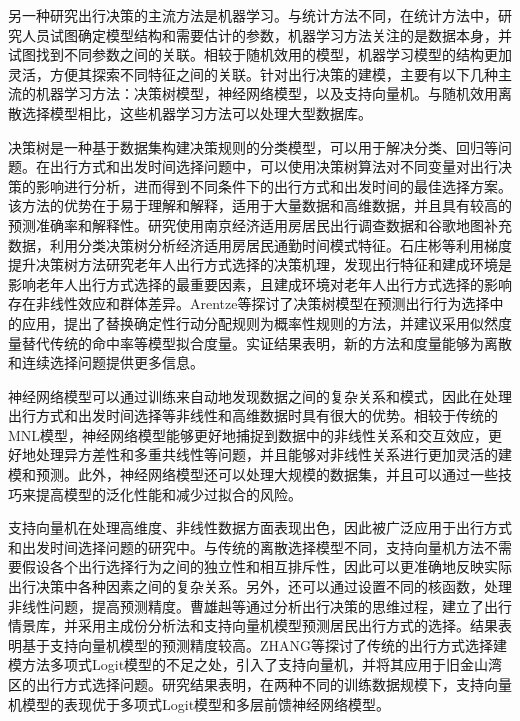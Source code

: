另一种研究出行决策的主流方法是机器学习。与统计方法不同，在统计方法中，研究人员试图确定模型结构和需要估计的参数，机器学习方法关注的是数据本身，并试图找到不同参数之间的关联\cite{mahesh2020machine}。相较于随机效用的模型，机器学习模型的结构更加灵活，方便其探索不同特征之间的关联。针对出行决策的建模，主要有以下几种主流的机器学习方法：决策树模型，神经网络模型，以及支持向量机\cite{pineda2019review}。与随机效用离散选择模型相比，这些机器学习方法可以处理大型数据库。

决策树是一种基于数据集构建决策规则的分类模型，可以用于解决分类、回归等问题。在出行方式和出发时间选择问题中，可以使用决策树算法对不同变量对出行决策的影响进行分析，进而得到不同条件下的出行方式和出发时间的最佳选择方案。该方法的优势在于易于理解和解释，适用于大量数据和高维数据，并且具有较高的预测准确率和解释性。研究\cite{以中国南京为例}使用南京经济适用房居民出行调查数据和谷歌地图补充数据，利用分类决策树分析经济适用房居民通勤时间模式特征。石庄彬\cite{石庄彬}等利用梯度提升决策树方法研究老年人出行方式选择的决策机理，发现出行特征和建成环境是影响老年人出行方式选择的最重要因素，且建成环境对老年人出行方式选择的影响存在非线性效应和群体差异。Arentze等\cite{arentze2003measuring}探讨了决策树模型在预测出行行为选择中的应用，提出了替换确定性行动分配规则为概率性规则的方法，并建议采用似然度量替代传统的命中率等模型拟合度量。实证结果表明，新的方法和度量能够为离散和连续选择问题提供更多信息。

神经网络模型可以通过训练来自动地发现数据之间的复杂关系和模式，因此在处理出行方式和出发时间选择等非线性和高维数据时具有很大的优势。相较于传统的MNL模型，神经网络模型能够更好地捕捉到数据中的非线性关系和交互效应，更好地处理异方差性和多重共线性等问题，并且能够对非线性关系进行更加灵活的建模和预测。此外，神经网络模型还可以处理大规模的数据集，并且可以通过一些技巧来提高模型的泛化性能和减少过拟合的风险。

支持向量机在处理高维度、非线性数据方面表现出色，因此被广泛应用于出行方式和出发时间选择问题的研究中。与传统的离散选择模型不同，支持向量机方法不需要假设各个出行选择行为之间的独立性和相互排斥性，因此可以更准确地反映实际出行决策中各种因素之间的复杂关系。另外，还可以通过设置不同的核函数，处理非线性问题，提高预测精度。曹雄赳等\cite{曹雄赳}通过分析出行决策的思维过程，建立了出行情景库，并采用主成份分析法和支持向量机模型预测居民出行方式的选择。结果表明基于支持向量机模型的预测精度较高。ZHANG等\cite{zhang2008travel}探讨了传统的出行方式选择建模方法多项式Logit模型的不足之处，引入了支持向量机，并将其应用于旧金山湾区的出行方式选择问题。研究结果表明，在两种不同的训练数据规模下，支持向量机模型的表现优于多项式Logit模型和多层前馈神经网络模型。

